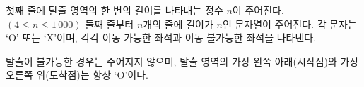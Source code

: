 첫째 줄에 탈출 영역의 한 변의 길이를 나타내는 정수 $n$이 주어진다. $(4 \le n \le 1\,000)$
둘째 줄부터 $n$개의 줄에 길이가 $n$인 문자열이 주어진다.
각 문자는 `O' 또는 `X'이며, 각각 이동 가능한 좌석과 이동 불가능한 좌석을 나타낸다.

탈출이 불가능한 경우는 주어지지 않으며, 탈출 영역의 가장 왼쪽 아래(시작점)와 가장 오른쪽 위(도착점)는 항상 `O'이다.
